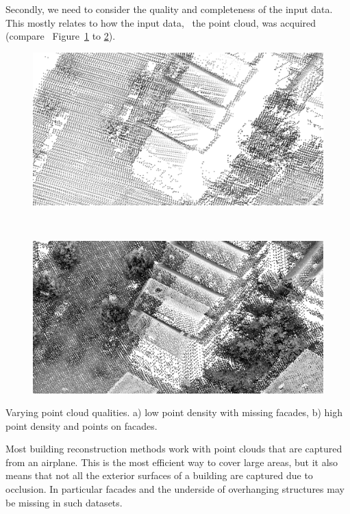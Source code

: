 Secondly, we need to consider the quality and completeness of the input data. This mostly relates to how the input data, \ie\ the point cloud, was acquired (compare \eg\ Figure~\ref{fig:pc-quality:low} to \ref{fig:pc-quality:high}).
\begin{marginfigure}
	\centering
	\begin{subfigure}{\linewidth}
		\includegraphics[width=\linewidth]{figs/rdam16_ahn2.png}
		\caption{}%
		\label{fig:pc-quality:low}
	\end{subfigure}
	\\
	\begin{subfigure}{\linewidth}
		\includegraphics[width=\linewidth]{figs/rdam16_d.png}
		\caption{}%
		\label{fig:pc-quality:high}
	\end{subfigure}
	\caption{Varying point cloud qualities. a) low point density with missing facades, b) high point density and points on facades.}%
	\label{fig:pc-quality}
\end{marginfigure}
Most building reconstruction methods work with point clouds that are captured from an airplane. 
This is the most efficient way to cover large areas, but it also means that not all the exterior surfaces of a building are captured due to occlusion. In particular facades and the underside of overhanging structures may be missing in such datasets. 
